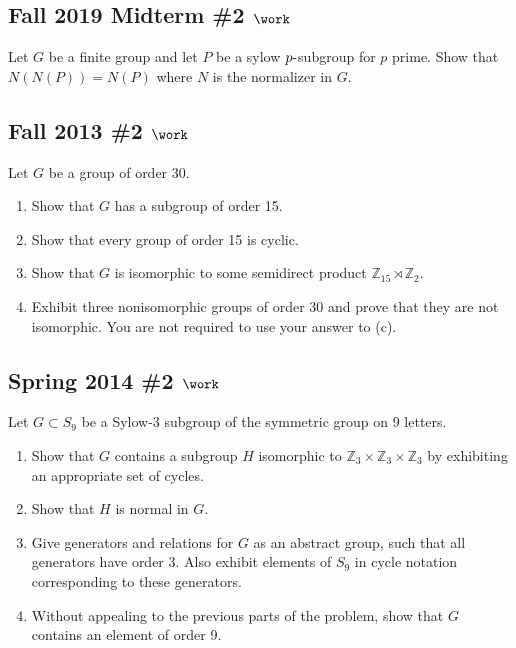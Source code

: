 \hypertarget{fall-2019-midterm-2-work}{%
\subsection{\texorpdfstring{Fall 2019 Midterm \#2
\(\work\)}{Fall 2019 Midterm \#2 \textbackslash work}}\label{fall-2019-midterm-2-work}}

Let \(G\) be a finite group and let \(P\) be a sylow
\(p{\hbox{-}}\)subgroup for \(p\) prime. Show that \(N(N(P)) = N(P)\)
where \(N\) is the normalizer in \(G\).

\hypertarget{fall-2013-2-work}{%
\subsection{\texorpdfstring{Fall 2013 \#2
\(\work\)}{Fall 2013 \#2 \textbackslash work}}\label{fall-2013-2-work}}

Let \(G\) be a group of order 30.

\begin{enumerate}
\def\labelenumi{\alph{enumi}.}
\item
  Show that \(G\) has a subgroup of order 15.
\item
  Show that every group of order 15 is cyclic.
\item
  Show that \(G\) is isomorphic to some semidirect product
  \({\mathbb{Z}}_{15} \rtimes{\mathbb{Z}}_2\).
\item
  Exhibit three nonisomorphic groups of order 30 and prove that they are
  not isomorphic. You are not required to use your answer to (c).
\end{enumerate}

\hypertarget{spring-2014-2-work}{%
\subsection{\texorpdfstring{Spring 2014 \#2
\(\work\)}{Spring 2014 \#2 \textbackslash work}}\label{spring-2014-2-work}}

Let \(G\subset S_9\) be a Sylow-3 subgroup of the symmetric group on 9
letters.

\begin{enumerate}
\def\labelenumi{\alph{enumi}.}
\item
  Show that \(G\) contains a subgroup \(H\) isomorphic to
  \({\mathbb{Z}}_3 \times{\mathbb{Z}}_3 \times{\mathbb{Z}}_3\) by
  exhibiting an appropriate set of cycles.
\item
  Show that \(H\) is normal in \(G\).
\item
  Give generators and relations for \(G\) as an abstract group, such
  that all generators have order 3. Also exhibit elements of \(S_9\) in
  cycle notation corresponding to these generators.
\item
  Without appealing to the previous parts of the problem, show that
  \(G\) contains an element of order 9.
\end{enumerate}

